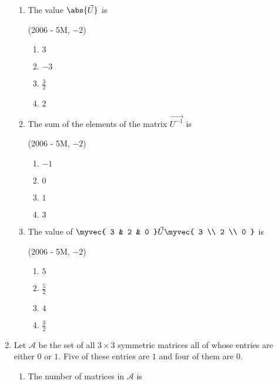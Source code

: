 \begin{enumerate}
	\begin{enumerate}
		\item The value $\abs{\vec{U}}$ is

			\hfill(2006 - 5M, $-2$)

			\begin{enumerate}
				\item $3$
				\item $-3$
			\item $\frac{3}{2}$
				\item $2$
			\end{enumerate}

		\item The sum of the elements of the matrix $\vec{U^{-1}}$ is

			\hfill(2006 - 5M, $-2$)

			\begin{enumerate}
				\item $-1$
				\item $0$
				\item $1$
				\item $3$
			\end{enumerate}

		\item The value of $\myvec{ 3 & 2 & 0 }
				\vec{U}
				\myvec{ 3 \\ 2 \\ 0 }$ is

			\hfill(2006 - 5M, $-2$)
			\begin{enumerate}
				\item $5$
				\item $\frac{5}{2}$
				\item $4$
				\item $\frac{3}{2}$
			\end{enumerate}
	\end{enumerate}




	\item Let $\mathcal{A}$ be the set of all $3\times3$ symmetric matrices all of whose entries are either $0$ or $1$. Five of these entries are $1$ and four of them are $0$.

	\begin{enumerate}
		\item The number of matrices in $\mathcal{A}$ is


\end{enumerate}
\end{enumerate}
